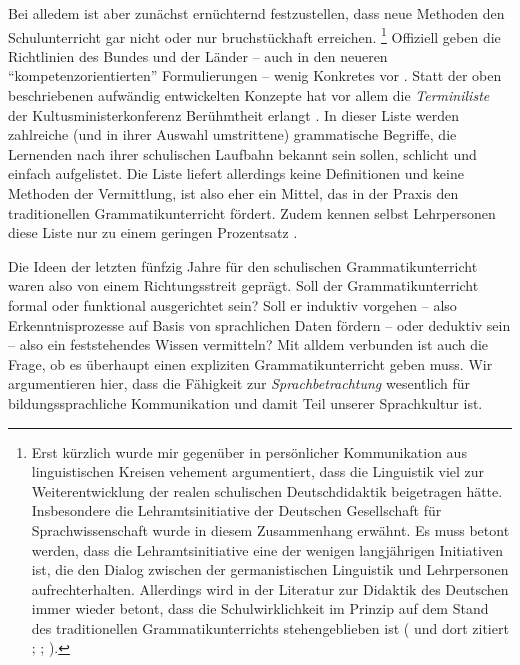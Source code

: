 Bei alledem ist aber zunächst ernüchternd festzustellen, dass neue Methoden den Schulunterricht gar nicht oder nur bruchstückhaft erreichen.%
\footnote{Erst kürzlich wurde mir gegenüber in persönlicher Kommunikation aus linguistischen Kreisen vehement argumentiert, dass die Linguistik viel zur Weiterentwicklung der realen schulischen Deutschdidaktik beigetragen hätte.
Insbesondere die Lehramtsinitiative der Deutschen Gesellschaft für Sprachwissenschaft wurde in diesem Zusammenhang erwähnt.
Es muss betont werden, dass die Lehramtsinitiative eine der wenigen langjährigen Initiativen ist, die den Dialog zwischen der germanistischen Linguistik und Lehrpersonen aufrechterhalten.
Allerdings wird in der Literatur zur Didaktik des Deutschen immer wieder betont, dass die Schulwirklichkeit im Prinzip auf dem Stand des traditionellen Grammatikunterrichts stehengeblieben ist (\zB \citealt[211]{Steets2003} und dort zitiert \citealt[143]{SteinigHuneke2002}; \citealt[243,257]{Bredel2013}; \citealt[2]{KoepckeZiegler2013}).}
Offiziell geben die Richtlinien des Bundes und der Länder -- auch in den neueren "`kompetenzorientierten"' Formulierungen -- wenig Konkretes vor \citep[250--255]{Bredel2013}.
Statt der oben beschriebenen aufwändig entwickelten Konzepte hat vor allem die \textit{Terminiliste} der Kultusministerkonferenz Berühmtheit erlangt \citep[244--249]{Bredel2013}.
In dieser Liste werden zahlreiche (und in ihrer Auswahl umstrittene) grammatische Begriffe, die Lernenden nach ihrer schulischen Laufbahn bekannt sein sollen, schlicht und einfach aufgelistet.
Die Liste liefert allerdings keine Definitionen und keine Methoden der Vermittlung, ist also eher ein Mittel, das in der Praxis den traditionellen Grammatikunterricht fördert.
Zudem kennen selbst Lehrpersonen diese Liste nur zu einem geringen Prozentsatz \citep{Haecker2009}.

Die Ideen der letzten fünfzig Jahre für den schulischen Grammatikunterricht waren also von einem Richtungsstreit geprägt.
Soll der Grammatikunterricht formal oder funktional ausgerichtet sein?
Soll er induktiv vorgehen -- also Erkenntnisprozesse auf Basis von sprachlichen Daten fördern -- oder deduktiv sein -- also ein feststehendes Wissen vermitteln?
Mit alldem verbunden ist auch die Frage, ob es überhaupt einen expliziten Grammatikunterricht geben muss.
Wir argumentieren hier, dass die Fähigkeit zur \textit{Sprachbetrachtung} wesentlich für bildungssprachliche Kommunikation und damit Teil unserer Sprachkultur ist.

